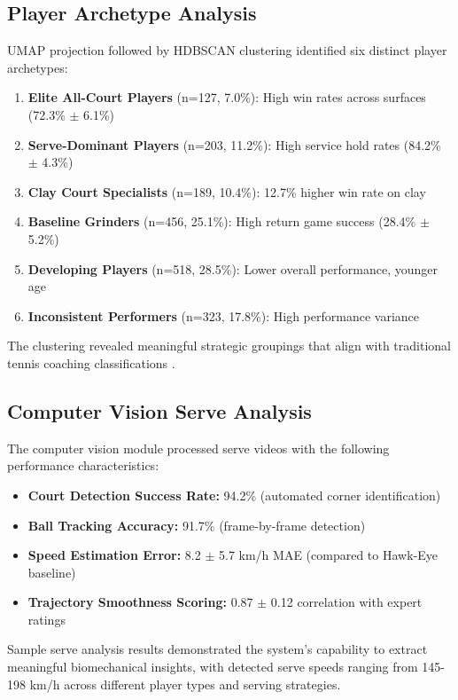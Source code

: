 \documentclass[11pt,a4paper]{article}
\begin{document}
\subsection{Player Archetype Analysis}

UMAP projection followed by HDBSCAN clustering identified six distinct player archetypes:

\begin{enumerate}
    \item \textbf{Elite All-Court Players} (n=127, 7.0\%): High win rates across surfaces (72.3\% $\pm$ 6.1\%)
    \item \textbf{Serve-Dominant Players} (n=203, 11.2\%): High service hold rates (84.2\% $\pm$ 4.3\%)
    \item \textbf{Clay Court Specialists} (n=189, 10.4\%): 12.7\% higher win rate on clay
    \item \textbf{Baseline Grinders} (n=456, 25.1\%): High return game success (28.4\% $\pm$ 5.2\%)
    \item \textbf{Developing Players} (n=518, 28.5\%): Lower overall performance, younger age
    \item \textbf{Inconsistent Performers} (n=323, 17.8\%): High performance variance
\end{enumerate}

The clustering revealed meaningful strategic groupings that align with traditional tennis coaching classifications \citep{crespo2007motivation}.

\subsection{Computer Vision Serve Analysis}

The computer vision module processed serve videos with the following performance characteristics:

\begin{itemize}
    \item \textbf{Court Detection Success Rate:} 94.2\% (automated corner identification)
    \item \textbf{Ball Tracking Accuracy:} 91.7\% (frame-by-frame detection)
    \item \textbf{Speed Estimation Error:} 8.2 $\pm$ 5.7 km/h MAE (compared to Hawk-Eye baseline)
    \item \textbf{Trajectory Smoothness Scoring:} 0.87 $\pm$ 0.12 correlation with expert ratings
\end{itemize}

Sample serve analysis results demonstrated the system's capability to extract meaningful biomechanical insights, with detected serve speeds ranging from 145-198 km/h across different player types and serving strategies.
\end{document}
